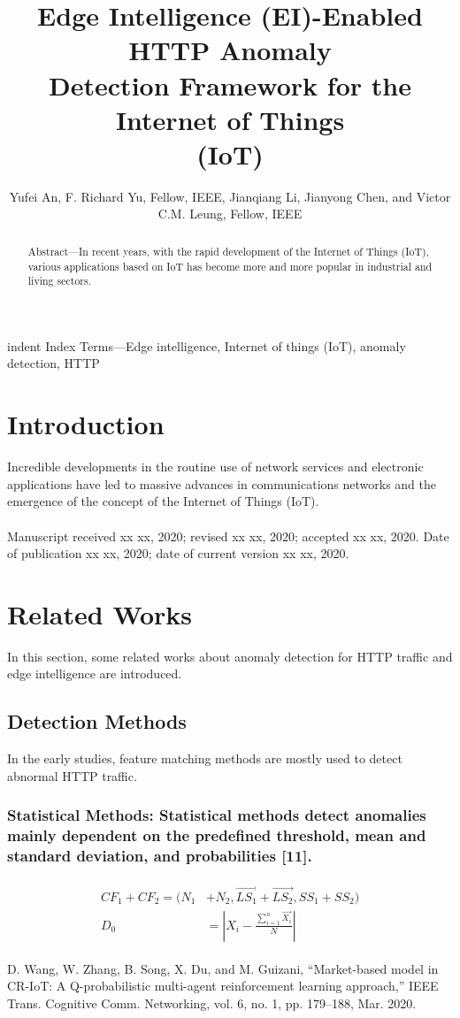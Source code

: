 \documentclass[journal]{IEEEtran}
\title{Edge Intelligence (EI)-Enabled HTTP Anomaly\\
Detection Framework for the Internet of Things\\
(IoT)}
\author{Yufei An, F. Richard Yu, Fellow, IEEE, Jianqiang Li, Jianyong Chen, and Victor C.M. Leung, Fellow, IEEE}
\begin{document}
\maketitle
\begin{abstract}
Abstract—In recent years, with the rapid development of the
Internet of Things (IoT), various applications based on IoT has
become more and more popular in industrial and living sectors.
\end{abstract}
\begin{IEEEkeywords}
indent Index Terms—Edge intelligence, Internet of things (IoT),
anomaly detection, HTTP
\end{IEEEkeywords}
\section{Introduction}
\IEEEPARstart{}\quad Incredible developments in the routine use of network services and electronic applications have led to massive advances
in communications networks and the emergence of the concept
of the Internet of Things (IoT).
\\ \\ \indent \footnotesize{  Manuscript received xx xx, 2020; revised xx xx, 2020; accepted xx xx,
2020. Date of publication xx xx, 2020; date of current version xx xx,
2020.}
\section{Related Works}
\IEEEPARstart{}\quad \normalsize In this section, some related works about anomaly detection
for HTTP traffic and edge intelligence are introduced.
\subsection{Detection Methods}
In the early studies, feature matching methods are mostly
used to detect abnormal HTTP traffic.
\subsubsection{Statistical Methods: Statistical methods detect anomalies mainly dependent on the predefined threshold, mean and
standard deviation, and probabilities [11].}

\begin{gather}
\begin{align}
CF_1+CF_2=(N_1&+N_2,\overrightarrow{LS_1}+\overrightarrow{LS_2},SS_1+SS_2) \\
           D_0&=|X_i-\frac{\sum^n_{i=1} \overrightarrow{X_i}}{N}|
\end{align}
\end{gather}
\begin{thebibliography}{99}
D. Wang, W. Zhang, B. Song, X. Du, and M. Guizani, “Market-based
model in CR-IoT: A Q-probabilistic multi-agent reinforcement learning
approach,” IEEE Trans. Cognitive Comm. Networking, vol. 6, no. 1, pp.
179–188, Mar. 2020.
\end{thebibliography}
\end{document}

